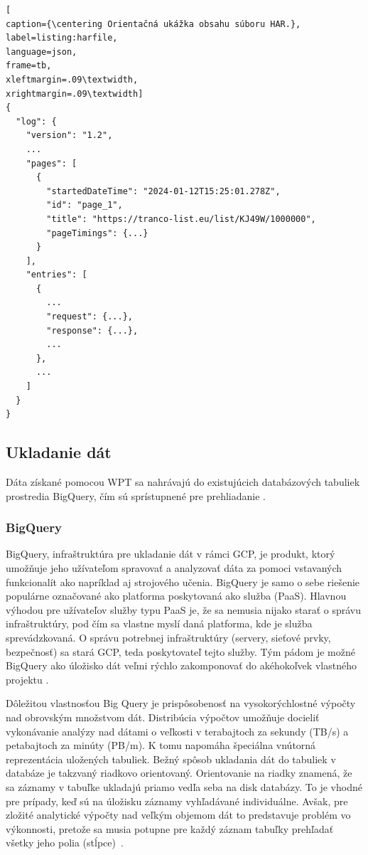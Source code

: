 \pagebreak

\begin{center}
\centering
\begin{lstlisting}[
caption={\centering Orientačná ukážka obsahu súboru HAR.},
label=listing:harfile, 
language=json, 
frame=tb,
xleftmargin=.09\textwidth, 
xrightmargin=.09\textwidth]
{
  "log": {
    "version": "1.2",
    ...
    "pages": [
      {
        "startedDateTime": "2024-01-12T15:25:01.278Z",
        "id": "page_1",
        "title": "https://tranco-list.eu/list/KJ49W/1000000",
        "pageTimings": {...}
      }
    ],
    "entries": [
      {
        ...
        "request": {...},
        "response": {...},
        ...
      },
      ...
    ]
  }
}
\end{lstlisting}
\end{center} 

\subsection{Ukladanie dát}
\label{httparchive-data-storage}

Dáta získané pomocou WPT sa nahrávajú do existujúcich databázových tabuliek prostredia BigQuery, čím sú sprístupnené pre prehliadanie \cite{httparchive-faq}.

\subsubsection{BigQuery}
\label{big-query}

BigQuery, infraštruktúra pre ukladanie dát v rámci GCP, je produkt, ktorý umožňuje jeho užívateľom spravovať a analyzovať dáta za pomoci vstavaných funkcionalít ako napríklad aj strojového učenia.
BigQuery je samo o sebe riešenie populárne označované ako platforma poskytovaná ako služba (PaaS).
Hlavnou výhodou pre užívateľov služby typu PaaS je, že sa nemusia nijako starať o správu infraštruktúry, pod čím sa vlastne myslí daná platforma, kde je služba sprevádzkovaná.
O správu potrebnej infraštruktúry (servery, sieťové prvky, bezpečnosť) sa stará GCP, teda poskytovateľ tejto služby.
Tým pádom je možné BigQuery ako úložisko dát veľmi rýchlo zakomponovať do akéhokoľvek vlastného projektu \cite{google-bq}.

Dôležitou vlastnosťou Big Query je prispôsobenosť na vysokorýchlostné výpočty nad obrovským množstvom dát.
Distribúcia výpočtov umožňuje docieliť vykonávanie analýzy nad dátami o veľkosti v terabajtoch za sekundy (TB/s) a petabajtoch za minúty (PB/m).
K tomu napomáha špeciálna vnútorná reprezentácia uložených tabuliek. 
Bežný spôsob ukladania dát do tabuliek v databáze je takzvaný riadkovo orientovaný.
Orientovanie na riadky znamená, že sa záznamy v tabuľke ukladajú priamo vedľa seba na disk databázy.
To je vhodné pre prípady, keď sú na úložisku záznamy vyhľadávané individuálne.
Avšak, pre zložité analytické výpočty nad veľkým objemom dát to predstavuje problém vo výkonnosti, pretože sa musia potupne pre každý záznam tabuľky prehľadať všetky jeho polia \mbox{(stĺpce) \cite{google-bq}}.


